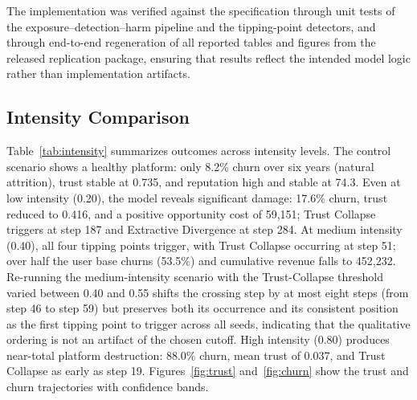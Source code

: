 \documentclass[a4paper]{article}
\begin{document}
The implementation was verified against the specification through unit tests of the exposure--detection--harm pipeline and the tipping-point detectors, and through end-to-end regeneration of all reported tables and figures from the released replication package, ensuring that results reflect the intended model logic rather than implementation artifacts.

\subsection{Intensity Comparison}
Table~\ref{tab:intensity} summarizes outcomes across intensity levels. The control scenario shows a healthy platform: only 8.2\%  churn over six years (natural attrition), trust stable at 0.735, and reputation high and stable at 74.3. Even at low intensity (0.20), the model reveals significant damage: 17.6\%  churn, trust reduced to 0.416, and a positive opportunity cost of 59,151; Trust Collapse triggers at step 187  and Extractive Divergence at step 284. At medium intensity (0.40), all four tipping points trigger, with Trust Collapse occurring at step 51; over half the user base churns (53.5\%) and cumulative revenue falls to 452,232. Re-running the medium-intensity scenario with the Trust-Collapse threshold varied between 0.40 and 0.55 shifts the crossing step by at most eight steps (from step 46 to step 59) but preserves both its occurrence and its consistent position as the first tipping point to trigger across all seeds, indicating that the qualitative ordering is not an artifact of the chosen cutoff. High intensity (0.80) produces near-total platform destruction: 88.0\%  churn, mean trust of 0.037, and Trust Collapse as early as step 19. Figures~\ref{fig:trust} and~\ref{fig:churn} show the trust and churn trajectories with confidence bands.
\end{document}
